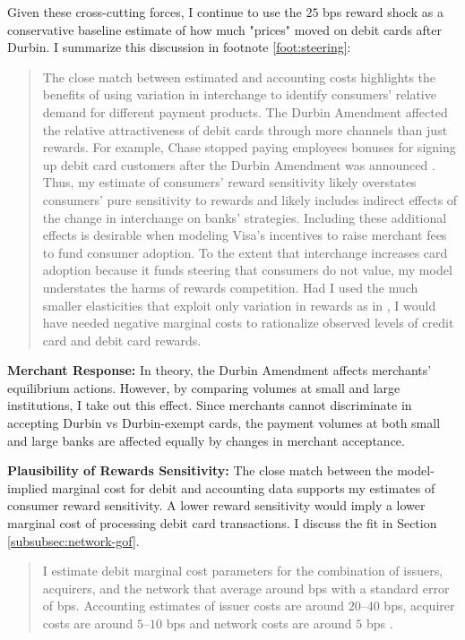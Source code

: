 \documentclass[main.tex]{subfiles}
\begin{document}
\begin{refsection}
Given these cross-cutting forces, I continue to use the $25$ bps reward shock as a conservative baseline estimate of how much "prices" moved on debit cards after Durbin.
I summarize this discussion in footnote \ref{foot:steering}:

\begin{quotation}
    The close match between estimated and accounting costs highlights the benefits of using variation in interchange to identify consumers' relative demand for different payment products.
The Durbin Amendment affected the relative attractiveness of debit cards through more channels than just rewards.
For example, Chase stopped paying employees bonuses for signing up debit card customers after the Durbin Amendment was announced \parencite{Johnson2010}.
Thus, my estimate of consumers' reward sensitivity likely overstates consumers' pure sensitivity to rewards and likely includes indirect effects of the change in interchange on banks' strategies.
Including these additional effects is desirable when modeling Visa's incentives to raise merchant fees to fund consumer adoption.
To the extent that interchange increases card adoption because it funds steering that consumers do not value, my model understates the harms of rewards competition.
Had I used the much smaller elasticities that exploit only variation in rewards as in \textcite{Arango.etal2015}, I would have needed negative marginal costs to rationalize observed levels of credit card and debit card rewards.
\end{quotation}

\textbf{Merchant Response: } In theory, the Durbin Amendment affects merchants' equilibrium actions.
However, by comparing volumes at small and large institutions, I take out this effect.
Since merchants cannot discriminate in accepting Durbin vs Durbin-exempt cards, the payment volumes at both small and large banks are affected equally by changes in merchant acceptance.

\textbf{Plausibility of Rewards Sensitivity: } The close match between the model-implied marginal cost for debit and accounting data supports my estimates of consumer reward sensitivity.
A lower reward sensitivity would imply a lower marginal cost of processing debit card transactions.
I discuss the fit in Section \ref{subsubsec:network-gof}.

\begin{quote}
    I estimate debit marginal cost parameters for the combination of issuers, acquirers, and the network that average around  bps with a standard error of  bps.
    Accounting estimates of issuer costs are around $20$--$40$ bps, acquirer costs are around $5$--$10$ bps and network costs are around $5$ bps \parencite{Lowe2005, Mukharlyamov.Sarin2025, NACHA2017, Visa2020}.    
\end{quote}


\end{refsection}
\end{document}
